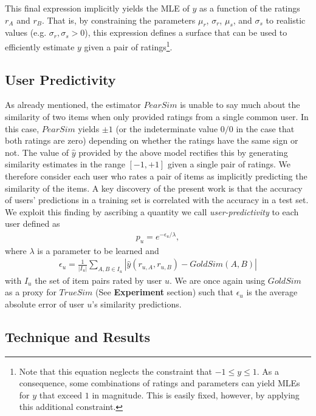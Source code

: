 \documentclass[11pt]{article}
\begin{document}
This final expression implicitly yields the MLE of $y$ as a function of the
ratings $r_A$ and $r_B$. That is, by constraining the parameters $\mu_r$,
$\sigma_r$, $\mu_s$, and $\sigma_s$ to realistic values (e.g. $\sigma_r,
\sigma_s > 0$), this expression defines a surface that can be used to
efficiently estimate $y$ given a pair of ratings\footnote{Note that this
equation neglects the constraint that $-1 \leq y \leq 1$. As a consequence, some
combinations of ratings and parameters can yield MLEs for $y$ that exceed $1$ in
magnitude. This is easily fixed, however, by applying this additional
constraint.}.

\subsection*{User Predictivity}

As already mentioned, the estimator $PearSim$ is unable to say much about the
similarity of two items when only provided ratings from a single common user. In
this case, $PearSim$ yields $\pm1$ (or the indeterminate value $0/0$ in the case
that both ratings are zero) depending on whether the ratings have the same sign
or not. The value of $\hat{y}$ provided by the above model rectifies this by
generating similarity estimates in the range $[-1, +1]$ given a single pair of
ratings. We therefore consider each user who rates a pair of items as implicitly
predicting the similarity of the items. A key discovery of the present work is
that the accuracy of users' predictions in a training set is correlated with the
accuracy in a test set. We exploit this finding by ascribing a quantity we call
{\em user-predictivity} to each user defined as
\begin{align}\label{eqn:predictivity}
p_u = e^{-\epsilon_u/\lambda},
\end{align}
where $\lambda$ is a parameter to be learned and
\begin{align}\label{eqn:userError}
\epsilon_u = \frac{1}{\left|I_u\right|}
\sum_{A,B \in I_u}{\left|\hat{y}(r_{u,A},r_{u,B}) - GoldSim(A, B)\right|}
\end{align}
with $I_u$ the set of item pairs rated by user $u$. We are once again using
$GoldSim$ as a proxy for $TrueSim$ (See {\bf Experiment} section) such that
$\epsilon_u$ is the average absolute error of user $u$'s similarity predictions.

\subsection*{Technique and Results}
\end{document}
